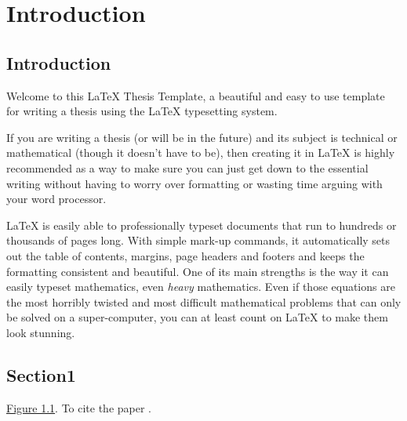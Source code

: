 \documentclass[thesis.tex]{subfiles}
\begin{document}
\newpage
\setcounter{chapter}{0} %


  
\thispagestyle{empty}

\chapter{Introduction}\label{chap1:introduction}
\section{Introduction}

Welcome to this \LaTeX{} Thesis Template, a beautiful and easy to use template for writing a thesis using the \LaTeX{} typesetting system.

If you are writing a thesis (or will be in the future) and its subject is technical or mathematical (though it doesn't have to be), then creating it in \LaTeX{} is highly recommended as a way to make sure you can just get down to the essential writing without having to worry over formatting or wasting time arguing with your word processor.

\LaTeX{} is easily able to professionally typeset documents that run to hundreds or thousands of pages long. With simple mark-up commands, it automatically sets out the table of contents, margins, page headers and footers and keeps the formatting consistent and beautiful. One of its main strengths is the way it can easily typeset mathematics, even \emph{heavy} mathematics. Even if those equations are the most horribly twisted and most difficult mathematical problems that can only be solved on a super-computer, you can at least count on \LaTeX{} to make them look stunning.

\section{Section1}
   \lipsum[1] \hyperref[1figure1]{Figure 1.1}. 
To cite the paper \cite{singh2026, singh2023robot}.
\end{document}
